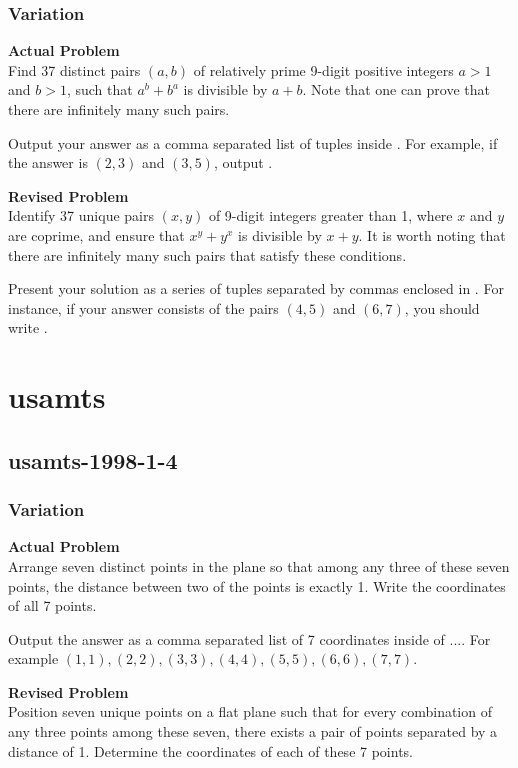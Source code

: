 \subsubsection{Variation}
\textbf{Actual Problem}\\
Find 37 distinct pairs $(a,b)$ of relatively prime 9-digit positive integers $a>1$ and $b>1$, such that $a^b+b^a$ is divisible by $a+b$. Note that one can prove that there are infinitely many such pairs.

Output your answer as a comma separated list of tuples inside . For example, if the answer is $(2,3)$ and $(3,5)$, output .

\textbf{Revised Problem}\\
Identify 37 unique pairs $(x, y)$ of 9-digit integers greater than 1, where $x$ and $y$ are coprime, and ensure that $x^y + y^x$ is divisible by $x + y$. It is worth noting that there are infinitely many such pairs that satisfy these conditions.

Present your solution as a series of tuples separated by commas enclosed in . For instance, if your answer consists of the pairs $(4,5)$ and $(6,7)$, you should write .

\section{usamts}
\subsection{usamts-1998-1-4}
\subsubsection{Variation}
\textbf{Actual Problem}\\
Arrange seven distinct points in the plane so that among any three of these seven points, the distance between two of the points is exactly 1.
Write the coordinates of all 7 points.

Output the answer as a comma separated list of 7 coordinates inside of $\boxed{...}$. For example $\boxed{(1, 1), (2, 2), (3, 3), (4, 4), (5, 5), (6, 6), (7, 7)}$.

\textbf{Revised Problem}\\
Position seven unique points on a flat plane such that for every combination of any three points among these seven, there exists a pair of points separated by a distance of 1. Determine the coordinates of each of these 7 points.

